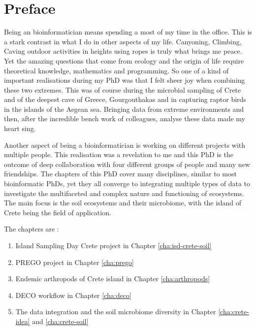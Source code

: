 \documentclass[
11pt, %
english, %
singlespacing, %
liststotoc, %
toctotoc, %
headsepline, %
]{MastersDoctoralThesis} %
\begin{document}

\chapter*{Preface}

Being an bioinformatician means spending a most of my time in the office. This is a 
stark contrast in what I do in other aspects of my life. Canyoning, Climbing, Caving 
outdoor activities in heights using ropes is truly what brings me peace. Yet the 
amazing questions that come from ecology and the origin of life require theoretical 
knowledge, mathematics and programming. So one of a kind of important realisations
during my PhD was that I felt sheer joy when combining these two extremes. This was
of course during the microbial sampling of Crete and of the deepest cave of Greece, Gourgouthakas
and in capturing raptor birds in the islands of the Aegean sea. Bringing data from 
extreme environments and then, after the incredible bench work of colleagues, analyse 
these data made my heart sing.

Another aspect of being a bioinformatician is working on different projects with 
multiple people. This realisation was a revelation to me and this PhD is the outcome 
of deep collaboration with four different groups of people and many new friendships. 
The chapters of this PhD cover many disciplines, similar to most bioinformatic PhDs,
yet they all converge to integrating multiple types of data to investigate the multifaceted
and complex nature and functioning of ecosystems. The main focus is the soil ecosystems and 
their microbiome, with the island of Crete being the field of application.

The chapters are :

\begin{enumerate}
    \item Island Sampling Day Crete project in Chapter \ref{cha:isd-crete-soil}
    \item PREGO project in Chapter \ref{cha:prego}
    \item Endemic arthropods of Crete island in Chapter \ref{cha:arthropods}
    \item DECO workflow in Chapter \ref{cha:deco}
    \item The data integration and the soil microbiome diversity in Chapter \ref{cha:crete-idea} and \ref{cha:crete-soil}
\end{enumerate}
\end{document}

